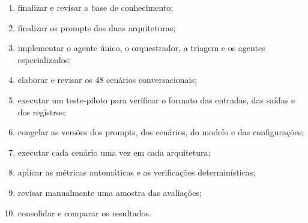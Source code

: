 \begin{enumerate}
    \item finalizar e revisar a base de conhecimento;
    \item finalizar os prompts das duas arquiteturas;
    \item implementar o agente único, o orquestrador, a triagem e os agentes especializados;
    \item elaborar e revisar os 48 cenários conversacionais;
    \item executar um teste-piloto para verificar o formato das entradas, das saídas e dos registros;
    \item congelar as versões dos prompts, dos cenários, do modelo e das configurações;
    \item executar cada cenário uma vez em cada arquitetura;
    \item aplicar as métricas automáticas e as verificações determinísticas;
    \item revisar manualmente uma amostra das avaliações;
    \item consolidar e comparar os resultados.
\end{enumerate}

